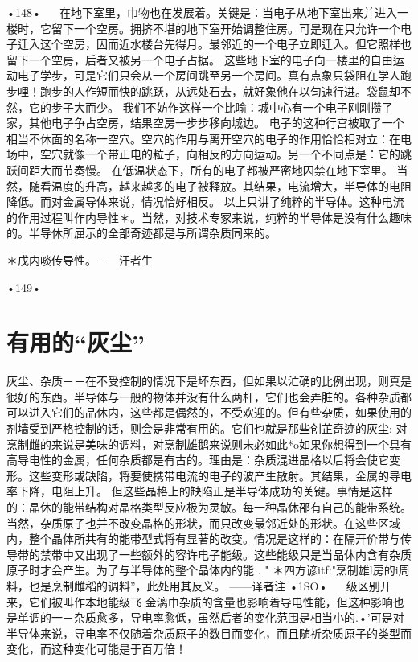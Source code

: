 {•148•
  
在地下室里，巾物也在发展着。关键是：当电子从地下室出来并进入一楼时，它留下一个空房。拥挤不堪的地下室开始调整住房。可是现在只允许一个电子迁入这个空房，因而近水楼台先得月。最邻近的一个电子立即迁入。但它照样也留下一个空房，后者又被另一个电子占据。
这些地下室的电子向一楼里的自由运动电子学步，可是它们只会从一个房间跳至另一个房间。真有点象只袋阻在学人跑步哩！跑步的人作短而快的跳跃，从远处石去，就好象他在以匀速行进。袋鼠却不然，它的步子大而少。
我们不妨作这样一个比喻：城中心有一个电子刚刚攒了家，其他电子争占空房，结果空房一步步移向城边。
电子的这种行宫被取了一个相当不休面的名称一空穴。空穴的作用与离开空穴的电子的作用恰恰相对立：在电场中，空穴就像一个带正电的粒子，向相反的方向运动。另一个不同点是：它的跳跃间距大而节奏慢。
在低温状态下，所有的电子都被严密地囚禁在地下室里。
当然，随看温度的升高，越来越多的电子被释放。其结果，电流增大，半导体的电阻降低。而对金属导体来说，情况恰好相反。
以上只讲了纯粹的半导体。这种电流的作用过程叫作内导性＊。当然，对技术专冢来说，纯粹的半导体是没有什么趣味的。半导休所屈示的全部奇迹都是与所谓杂质同来的。

＊戊内啖传导性。－－汗者生

•149•
  
\section{有用的“灰尘”}

灰尘、杂质－－在不受控制的情况下是坏东西，但如果以汒确的比例出现，则真是很好的东西。半导体与一般的物体并没有什么两杆，它们也会弄脏的。各种杂质都可以进入它们的品休内，这些都是偶然的，不受欢迎的。但有些杂质，如果使用的剂墙受到严格控制的话，则会是非常有用的。它们也就是那些创芷奇迹的灰尘:
对烹制雌的来说是美味的调料，对烹制雄鹅来说则未必如此*o如果你想得到一个具有高导电性的金属，任何杂质都是有古的。理由是：杂质混进晶格以后将会使它变形。这些变形或缺陷，将要使携带电流的电子的波产生散射。其结果，金属的导电率下降，电阻上升。
但这些晶格上的缺陷正是半导体成功的关键。事情是这样的：晶休的能带结构对晶格类型反应极为灵敏。每一种晶休邵有自己的能带系统。
当然，杂质原子也并不改变晶格的形状，而只改变最邻近处的形状。在这些区域内，整个晶体所共有的能带型式将有显著的改变。情况是这样的：在隔开价带与传导带的禁带中又出现了一些额外的容许电子能级。这些能级只是当品休内含有杂质原子时才会产生。为了与半导体的整个晶体内的能
	.	"
＊四方谚itf:"烹制雄l房的i周料，也是烹制雌稻的调料”，此处用其反义。
——译者注
•1SO•
  
级区别开来，它们被叫作本地能级飞
金漓巾杂质的含量也影响着导电性能，但这种影响也是单调的一－杂质愈多，导电率愈低，虽然后者的变化范围是相当小的.•'可是对半导体来说，导电率不仅随着杂质原子的数目而变化，而且随祈杂质原子的类型而变化，而这种变化可能是于百万倍！

}
